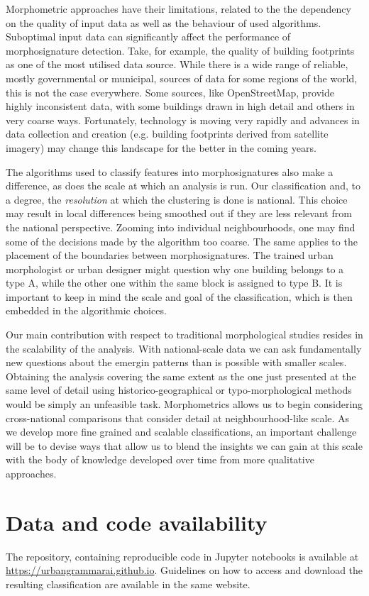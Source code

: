 Morphometric approaches have their limitations, related to the the dependency on the
quality of input data as well as the behaviour of used algorithms. Suboptimal
input data can significantly affect the performance of morphosignature detection. Take, for example,
the quality of building footprints as one of the most utilised data source. While there
is a wide range of reliable, mostly governmental or municipal, sources of data
for some regions of the world, this is not the case everywhere. Some sources, like OpenStreetMap, provide highly
inconsistent data, with some buildings drawn in high detail and others in very
coarse ways. Fortunately, technology is moving very rapidly and advances in
data collection and creation (e.g. building footprints derived from satellite
imagery) may change this landscape for the better in the coming years.

The algorithms used to classify features into morphosignatures also make a
difference, as does the scale at which an analysis is run.
Our classification and, to a degree, the
\textit{resolution} at which the clustering is done is national. This choice may result in local
differences being smoothed out if they are less relevant from the national
perspective. Zooming into individual neighbourhoods, one may find some of the
decisions made by the algorithm too coarse. The same applies to the placement of the boundaries between morphosignatures.
The trained urban morphologist or urban designer might question why one building
belongs to a type A, while the other one within the same block is assigned to
type B. It is important to
keep in mind the scale and goal of the classification, which is then embedded
in the algorithmic choices.

Our main contribution with respect to traditional
morphological studies resides in the scalability of the analysis. With national-scale data we can ask
fundamentally new questions about the emergin patterns than is possible with
smaller scales. Obtaining the analysis covering
the same extent as the one just presented at the same level of detail using
historico-geographical or typo-morphological methods would be simply an unfeasible task.
Morphometrics allows us to begin considering cross-national comparisons that
consider detail at neighbourhood-like scale.
%
As we develop more fine grained and scalable classifications, an
important challenge will be to devise ways that allow us to blend the
insights we can gain at this scale with the body of knowledge developed over
time from more qualitative approaches.

\section{Data and code availability}
The repository, containing reproducible code in Jupyter notebooks is available at
\url{https://urbangrammarai.github.io}. Guidelines on how to access and
download the resulting classification are available in the same website.
